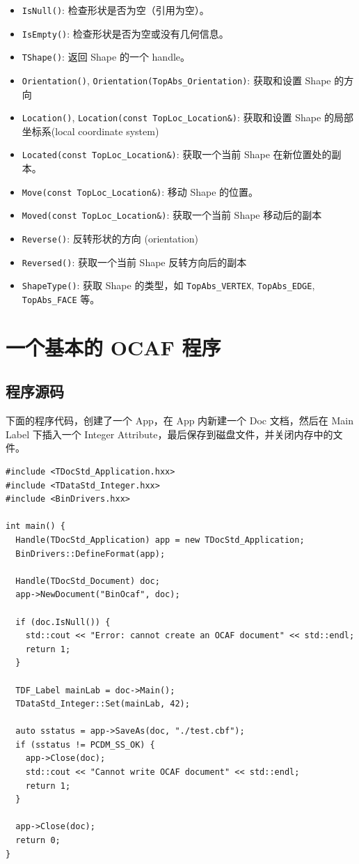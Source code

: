 \documentclass[11pt]{article}
\begin{document}
\begin{itemize}
\item \texttt{IsNull()}: 检查形状是否为空（引用为空）。
\item \texttt{IsEmpty()}: 检查形状是否为空或没有几何信息。
\item \texttt{TShape()}: 返回 Shape 的一个 handle。
\item \texttt{Orientation()}, \texttt{Orientation(TopAbs\_Orientation)}: 获取和设置 Shape 的方向
\item \texttt{Location()}, \texttt{Location(const TopLoc\_Location\&)}: 获取和设置 Shape 的局部坐标系(local coordinate system)
\item \texttt{Located(const TopLoc\_Location\&)}: 获取一个当前 Shape 在新位置处的副本。
\item \texttt{Move(const TopLoc\_Location\&)}: 移动 Shape 的位置。
\item \texttt{Moved(const TopLoc\_Location\&)}: 获取一个当前 Shape 移动后的副本
\item \texttt{Reverse()}: 反转形状的方向 (orientation)
\item \texttt{Reversed()}: 获取一个当前 Shape 反转方向后的副本
\item \texttt{ShapeType()}: 获取 Shape 的类型，如 \texttt{TopAbs\_VERTEX}, \texttt{TopAbs\_EDGE}, \texttt{TopAbs\_FACE} 等。
\end{itemize}
\section{一个基本的 OCAF 程序}
\label{sec:org4ebeee1}

\subsection{程序源码}
\label{sec:orgb47e533}

下面的程序代码，创建了一个 App，在 App 内新建一个 Doc 文档，然后在 Main Label 下插入一个 Integer Attribute，最后保存到磁盘文件，并关闭内存中的文件。

\begin{verbatim}
#include <TDocStd_Application.hxx>
#include <TDataStd_Integer.hxx>
#include <BinDrivers.hxx>

int main() {
  Handle(TDocStd_Application) app = new TDocStd_Application;
  BinDrivers::DefineFormat(app);

  Handle(TDocStd_Document) doc;
  app->NewDocument("BinOcaf", doc);

  if (doc.IsNull()) {
    std::cout << "Error: cannot create an OCAF document" << std::endl;
    return 1;
  }

  TDF_Label mainLab = doc->Main();
  TDataStd_Integer::Set(mainLab, 42);

  auto sstatus = app->SaveAs(doc, "./test.cbf");
  if (sstatus != PCDM_SS_OK) {
    app->Close(doc);
    std::cout << "Cannot write OCAF document" << std::endl;
    return 1;
  }

  app->Close(doc);
  return 0;
}
\end{verbatim}
\end{document}
